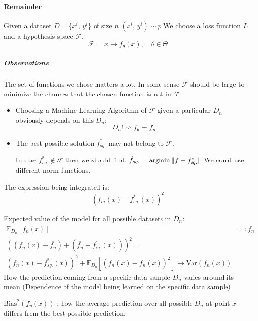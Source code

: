 \paragraph{Remainder}

Given a dataset \(D = \{x^i,\, y^i\}\) of size \(n\) \((x^i,\, y^i)\sim p\) We
choose a loss function \(L\) and a hypothesis space \(\mathcal F\).
\[\mathcal F \coloneqq { x \rightarrow f_\theta(x),\quad \theta \in \Theta }
\]

\subparagraph{Observations}

The set of functions we chose matters a lot. In some sense \(\mathcal F\) should
be large to minimize the chances that the chosen function is not in
\(\mathcal F\).

\begin{itemize}
	\item
	      Choosing a Machine Learning Algorithm of \(\mathcal F\) given a particular
	      \(D_n\) obviously depends on this \(D_n\):
	      \[D_n! \rightsquigarrow f_\theta = f_n\]
	\item The best possible solution \(f^*_{sq.}\) may not belong to \(\mathcal F\).

	      In case \(f^*_{sq.} \notin \mathcal F\) then we should find:
	      \(\hat{f}_{sq.} = \operatorname{argmin} {\lVert f - f^*_{sq.} \rVert}\)
	      We could use different norm functions.
\end{itemize}

The expression being integrated is:
\[\left( f_m(x) - f^*_{sq.}(x) \right)^2
\]

Expected value of the model for all possible datasets in \(D_n\):
\begin{align*}
	\mathds{E}_{D_n} \left[ f_n(x) \right] & \eqqcolon \overline{f_n}                                        \\
	\left( \left( f_n(x) - \overline{f_n} \right) + \left( \overline{f_n} - f_{sq.}^*(x) \right) \right)^2 = \\
	\left( \overline{f_n}(x) - f_{sq.}^*(x) \right)^2 +
	\mathds{E}_{D_n} \left[ \left( f_n(x) - \overline{f_n}(x) \right)^2 \right]
	\rightarrow \text{Var}(f_n(x))
\end{align*}
How the prediction coming from a specific data sample $D_n$ varies around its mean
(Dependence of the model being learned on the specific data sample)

\(\text{Bias}^2(f_n(x))\) : how the average prediction over all possible
\(D_n\) at point \(x\) differs from the best possible prediction.


